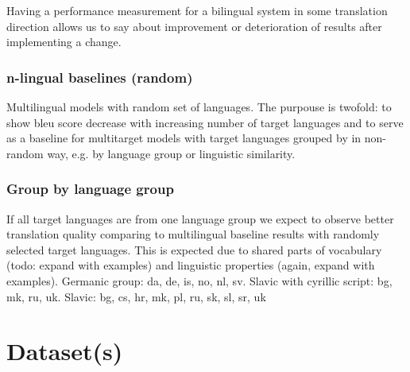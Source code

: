 Having a performance measurement for a bilingual system in some
translation direction allows us to say about improvement or deterioration of results after
implementing a change.



\subsubsection*{n-lingual baselines (random)}

Multilingual models with random set of languages.
The purpouse is twofold: 
to show \acrshort{bleu} score decrease with increasing number of target languages and
to serve as a baseline for multitarget models with target languages grouped by
in non-random way, e.g. by language group or linguistic similarity.


\subsubsection*{Group by language group}

If all target languages are from one language group we expect to observe
better translation quality comparing to multilingual baseline results 
with randomly selected target languages.
This is expected due to shared parts of vocabulary (todo: expand with examples)
and linguistic properties (again, expand with examples).
Germanic group: da, de, is, no, nl, sv.
Slavic with cyrillic script: bg, mk, ru, uk.
Slavic: bg, cs, hr, mk, pl, ru, sk, sl, sr, uk


% 





\section{Dataset(s)}
\label{section:datasets}


\subsection{}
\label{subsection:en-to-36}

